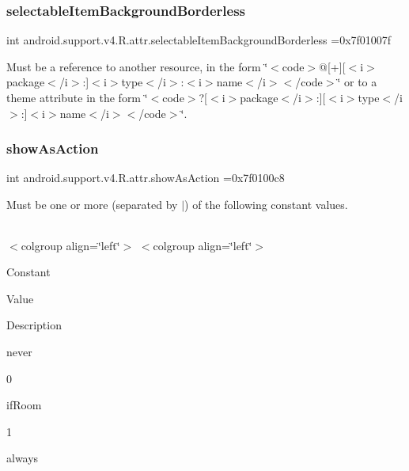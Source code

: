 \subsubsection{\texorpdfstring{selectable\+Item\+Background\+Borderless}{selectableItemBackgroundBorderless}}
{\footnotesize\ttfamily int android.\+support.\+v4.\+R.\+attr.\+selectable\+Item\+Background\+Borderless =0x7f01007f\hspace{0.3cm}{\ttfamily [static]}}

Must be a reference to another resource, in the form \char`\"{}$<$code$>$@\mbox{[}+\mbox{]}\mbox{[}$<$i$>$package$<$/i$>$\+:\mbox{]}$<$i$>$type$<$/i$>$\+:$<$i$>$name$<$/i$>$$<$/code$>$\char`\"{} or to a theme attribute in the form \char`\"{}$<$code$>$?\mbox{[}$<$i$>$package$<$/i$>$\+:\mbox{]}\mbox{[}$<$i$>$type$<$/i$>$\+:\mbox{]}$<$i$>$name$<$/i$>$$<$/code$>$\char`\"{}. \mbox{\label{classandroid_1_1support_1_1v4_1_1R_1_1attr_abcd33c251bf516613a4d29627aef5c27}} 
\subsubsection{\texorpdfstring{show\+As\+Action}{showAsAction}}
{\footnotesize\ttfamily int android.\+support.\+v4.\+R.\+attr.\+show\+As\+Action =0x7f0100c8\hspace{0.3cm}{\ttfamily [static]}}

Must be one or more (separated by \textquotesingle{}$\vert$\textquotesingle{}) of the following constant values.

\tabulinesep=1mm
\begin{longtabu} spread 0pt [c]{*{0}{|X[-1]}|}
\hline
\end{longtabu}
$<$colgroup align=\char`\"{}left\char`\"{}$>$ $<$colgroup align=\char`\"{}left\char`\"{}$>$ 

Constant

Value

Description 

{\ttfamily never}

0

{\ttfamily if\+Room}

1

{\ttfamily always}

